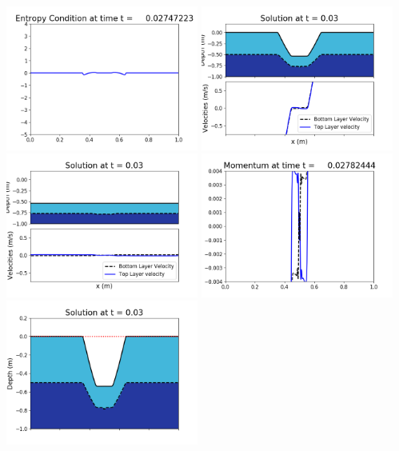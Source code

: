 \documentclass[11pt]{article}
\begin{document}
\vskip 10pt 
\includegraphics[width=0.475\textwidth]{frame0079fig1009.png}
\vskip 10pt 
\includegraphics[width=0.475\textwidth]{frame0080fig1001.png}
\includegraphics[width=0.475\textwidth]{frame0080fig1002.png}
\vskip 10pt 
\includegraphics[width=0.475\textwidth]{frame0080fig1003.png}
\includegraphics[width=0.475\textwidth]{frame0080fig1006.png}
\end{document}
